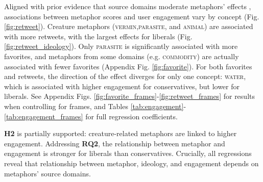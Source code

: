 

Aligned with prior evidence that source domains moderate metaphors' effects \citep{bosman_persuasive_1987}, associations between metaphor scores and user engagement vary by concept (Fig. \ref{fig:retweet}). Creature metaphors (\textsc{vermin},\textsc{parasite}, and \textsc{animal}) are associated with more retweets, with the largest effects for liberals (Fig. \ref{fig:retweet_ideology}). Only \textsc{parasite} is significantly associated with more favorites, and metaphors from some domains (e.g. \textsc{commodity}) are actually associated with fewer favorites (Appendix Fig. \ref{fig:favorite}). For both favorites and retweets, the direction of the effect diverges for only one concept: \textsc{water}, which is associated with higher engagement for conservatives, but lower for liberals. See Appendix Figs. \ref{fig:favorite_frames}-\ref{fig:retweet_frames} for results when controlling for frames, and Tables \ref{tab:engagement}-\ref{tab:engagement_frames} for full regression coefficients.



\textbf{H2} is partially supported: creature-related metaphors are linked to higher engagement. Addressing \textbf{RQ2}, the relationship between metaphor and engagement is stronger for liberals than conservatives. Crucially, all regressions reveal that relationship between metaphor, ideology, and engagement depends on metaphors' source domains.   






